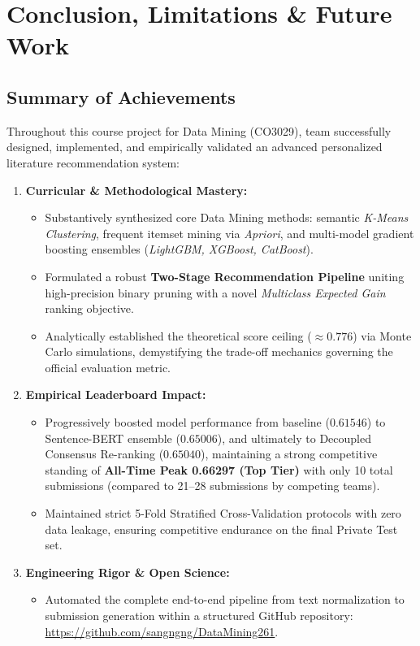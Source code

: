 \chapter{Conclusion, Limitations \& Future Work}
\label{chap:conclusion}

\section{Summary of Achievements}
Throughout this course project for Data Mining (CO3029), team \textbf{\TeamName} successfully designed, implemented, and empirically validated an advanced personalized literature recommendation system:

\begin{enumerate}
  \item \textbf{Curricular \& Methodological Mastery:}
    \begin{itemize}
      \item Substantively synthesized core Data Mining methods: semantic \textit{K-Means Clustering}, frequent itemset mining via \textit{Apriori}, and multi-model gradient boosting ensembles (\textit{LightGBM, XGBoost, CatBoost}).
      \item Formulated a robust \textbf{Two-Stage Recommendation Pipeline} uniting high-precision binary pruning with a novel \textit{Multiclass Expected Gain} ranking objective.
      \item Analytically established the theoretical score ceiling ($\approx 0.776$) via Monte Carlo simulations, demystifying the trade-off mechanics governing the official evaluation metric.
    \end{itemize}

  \item \textbf{Empirical Leaderboard Impact:}
    \begin{itemize}
      \item Progressively boosted model performance from baseline ($0.61546$) to Sentence-BERT ensemble ($0.65006$), and ultimately to Decoupled Consensus Re-ranking ($\mathbf{0.65040}$), maintaining a strong competitive standing of \textbf{All-Time Peak 0.66297 (Top Tier)} with only 10 total submissions (compared to 21--28 submissions by competing teams).
      \item Maintained strict 5-Fold Stratified Cross-Validation protocols with zero data leakage, ensuring competitive endurance on the final Private Test set.
    \end{itemize}

  \item \textbf{Engineering Rigor \& Open Science:}
    \begin{itemize}
      \item Automated the complete end-to-end pipeline from text normalization to submission generation within a structured GitHub repository: \url{https://github.com/sangngng/DataMining261}.
    \end{itemize}
\end{enumerate}

